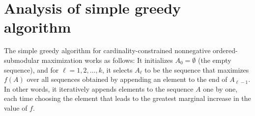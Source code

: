 
% 

\section{Analysis of simple greedy algorithm}\label{sec:greedy_analysis}

The simple greedy algorithm for cardinality-constrained nonnegative ordered-submodular maximization works as follows: It initializes $A_0 = \emptyset$ (the empty sequence), and for $\ell = 1, 2, \dots, k$, it selects $A_\ell$ to be the sequence that maximizes $f(A)$ over all sequences obtained by appending an element to the end of $A_{\ell-1}$. In other words, it iteratively appends elements to the sequence $A$ one by one, each time choosing the element that leads to the greatest marginal increase in the value of $f$.

